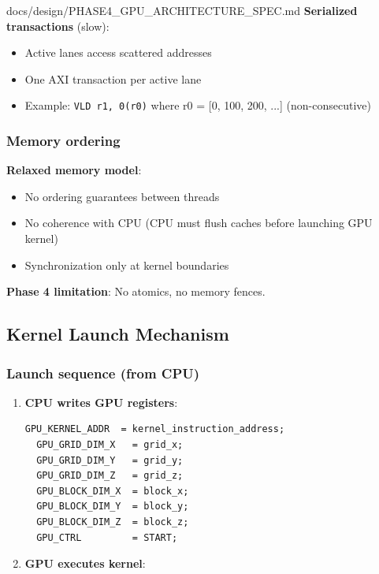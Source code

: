 \begin{relocated}{docs/design/PHASE4_GPU_ARCHITECTURE_SPEC.md}
\textbf{Serialized transactions} (slow):

\begin{itemize}
\tightlist
\item
  Active lanes access scattered addresses
\item
  One AXI transaction per active lane
\item
  Example: \texttt{VLD\ r1,\allowbreak{}\ 0(r0)} where r0 = {[}0, 100,
  200, ...{]} (non-consecutive)
\end{itemize}

\subsubsection{Memory ordering}\label{ds:ch:phase4-gpu-architecture:memory-ordering}

\textbf{Relaxed memory model}:

\begin{itemize}
\tightlist
\item
  No ordering guarantees between threads
\item
  No coherence with CPU (CPU must flush caches before launching GPU
  kernel)
\item
  Synchronization only at kernel boundaries
\end{itemize}

\textbf{Phase 4 limitation}: No atomics, no memory fences.

\subsection{Kernel Launch Mechanism}\label{ds:ch:phase4-gpu-architecture:kernel-launch-mechanism}

\subsubsection{Launch sequence (from CPU)}\label{ds:ch:phase4-gpu-architecture:launch-sequence-from-cpu}

\begin{enumerate}
\def\labelenumi{\arabic{enumi}.}
\item
  \textbf{CPU writes GPU registers}:

  \begin{lstlisting}[language={}]
  GPU_KERNEL_ADDR  = kernel_instruction_address;
  GPU_GRID_DIM_X   = grid_x;
  GPU_GRID_DIM_Y   = grid_y;
  GPU_GRID_DIM_Z   = grid_z;
  GPU_BLOCK_DIM_X  = block_x;
  GPU_BLOCK_DIM_Y  = block_y;
  GPU_BLOCK_DIM_Z  = block_z;
  GPU_CTRL         = START;
  \end{lstlisting}
\item
  \textbf{GPU executes kernel}:


\end{enumerate}
\end{relocated}

